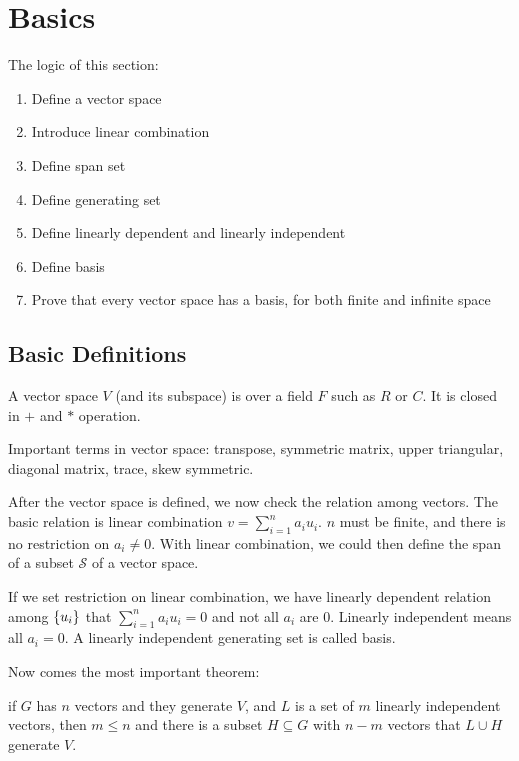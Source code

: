 \chapter{Basics}

The logic of this section:
\begin{enumerate}
    \item Define a vector space
    \item Introduce linear combination
    \item Define span set
    \item Define generating set
    \item Define linearly dependent and linearly independent
    \item Define basis
    \item Prove that every vector space has a basis, for both finite and infinite space
\end{enumerate}

\section{Basic Definitions}



A vector space $V$ (and its subspace) is over a field $F$ such as $R$ or $C$. It is closed in $+$ and $*$ operation.


Important terms in vector space: transpose, symmetric matrix, upper triangular, diagonal matrix, trace, skew symmetric.

After the vector space is defined, we now check the relation among vectors. The basic relation is linear combination $v = \sum_{i=1}^{n} a_i u_i$. $n$ must be finite, and there is no restriction on $a_i \neq 0$. With linear combination, we could then define the span of a subset $\mathcal{S}$ of a vector space. 

If we set restriction on linear combination, we have linearly dependent relation among $\set{u_i}$ that $\sum_{i=1}^{n} a_i u_i = 0$ and not all $a_i$ are $0$. Linearly independent means all $a_i = 0$. A linearly independent generating set is called basis.



Now comes the most important theorem:
\begin{theorem}\label{replacement_theorem}
    if $G$ has $n$ vectors and they generate $V$, and $L$ is a set of $m$ linearly independent vectors, then $m \leq n$ and there is a subset $H \subseteq G$ with $n-m$ vectors that $L \cup H $ generate $V$.
    
\end{theorem}

